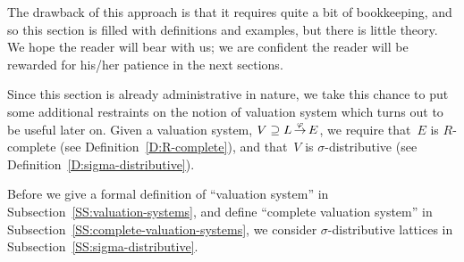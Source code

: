 \documentclass[main.tex]{subfiles}
\begin{document}
The drawback of this approach is that it requires
quite a bit of bookkeeping,
and so this section
is filled with definitions and examples,
but there is little theory.
We hope the reader will bear with us;
we are confident the reader will be rewarded
for his/her patience
in the next sections.

Since this section
 is already  administrative in nature,
we take this chance
to put 
 some additional restraints on
the notion of valuation system
which turns out to be useful later on.
Given a valuation system,
$V \supseteq L\,\smash{\stackrel{\varphi}{\rightarrow}}\,E$,
we  require that~$E$ is $R$-complete
(see Definition~\ref{D:R-complete}),
and that~$V$ is $\sigma$-distributive
(see Definition~\ref{D:sigma-distributive}).

Before we give a formal definition
of ``valuation system'' 
in Subsection~\ref{SS:valuation-systems},
and define ``complete valuation system''
in Subsection~\ref{SS:complete-valuation-systems},
we consider $\sigma$-distributive lattices
in Subsection~\ref{SS:sigma-distributive}.
%
%
\end{document}
